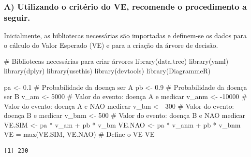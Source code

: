 \documentclass[
  letterpaper,
  DIV=11,
  numbers=noendperiod]{scrartcl}
\newenvironment{Shaded}{\begin{snugshade}}{\end{snugshade}}
\newcommand{\CommentTok}[1]{\textcolor[rgb]{0.37,0.37,0.37}{#1}}
\newcommand{\DecValTok}[1]{\textcolor[rgb]{0.68,0.00,0.00}{#1}}
\newcommand{\FloatTok}[1]{\textcolor[rgb]{0.68,0.00,0.00}{#1}}
\newcommand{\FunctionTok}[1]{\textcolor[rgb]{0.28,0.35,0.67}{#1}}
\newcommand{\NormalTok}[1]{\textcolor[rgb]{0.00,0.23,0.31}{#1}}
\newcommand{\OtherTok}[1]{\textcolor[rgb]{0.00,0.23,0.31}{#1}}
\newcommand{\SpecialCharTok}[1]{\textcolor[rgb]{0.37,0.37,0.37}{#1}}
\begin{document}
\hypertarget{a-utilizando-o-crituxe9rio-do-ve-recomende-o-procedimento-a-seguir.}{%
\subsubsection{A) Utilizando o critério do VE, recomende o procedimento
a
seguir.}\label{a-utilizando-o-crituxe9rio-do-ve-recomende-o-procedimento-a-seguir.}}

Inicialmente, as bibliotecas necessárias são importadas e definem-se os
dados para o cálculo do Valor Esperado (VE) e para a criação da árvore
de decisão.

\begin{Shaded}
\begin{Highlighting}[]
\CommentTok{\# Bibliotecas necessárias para criar árvores }
\FunctionTok{library}\NormalTok{(data.tree)}
\FunctionTok{library}\NormalTok{(yaml)}
\FunctionTok{library}\NormalTok{(dplyr)}
\FunctionTok{library}\NormalTok{(usethis)}
\FunctionTok{library}\NormalTok{(devtools)}
\FunctionTok{library}\NormalTok{(DiagrammeR)}

\NormalTok{pa }\OtherTok{\textless{}{-}} \FloatTok{0.1}       \CommentTok{\# Probabilidade da doença ser A}
\NormalTok{pb }\OtherTok{\textless{}{-}} \FloatTok{0.9}       \CommentTok{\# Probabilidade da doença ser B}
\NormalTok{v\_am }\OtherTok{\textless{}{-}} \DecValTok{5000}    \CommentTok{\# Valor do evento: doença A e medicar}
\NormalTok{v\_anm }\OtherTok{\textless{}{-}} \SpecialCharTok{{-}}\DecValTok{10000} \CommentTok{\# Valor do evento: doença A e NAO medicar}
\NormalTok{v\_bm }\OtherTok{\textless{}{-}} \SpecialCharTok{{-}}\DecValTok{300}    \CommentTok{\# Valor do evento: doença B e medicar}
\NormalTok{v\_bnm }\OtherTok{\textless{}{-}} \DecValTok{500}    \CommentTok{\# Valor do evento: doença B e NAO medicar}
\NormalTok{VE.SIM }\OtherTok{\textless{}{-}}\NormalTok{ pa }\SpecialCharTok{*}\NormalTok{ v\_am }\SpecialCharTok{+}\NormalTok{ pb }\SpecialCharTok{*}\NormalTok{ v\_bm}
\NormalTok{VE.NAO }\OtherTok{\textless{}{-}}\NormalTok{ pa }\SpecialCharTok{*}\NormalTok{ v\_anm }\SpecialCharTok{+}\NormalTok{ pb }\SpecialCharTok{*}\NormalTok{ v\_bnm}
\NormalTok{VE }\OtherTok{=} \FunctionTok{max}\NormalTok{(VE.SIM, VE.NAO) }\CommentTok{\# Define o VE}
\NormalTok{VE}
\end{Highlighting}
\end{Shaded}

\begin{verbatim}
[1] 230
\end{verbatim}
\end{document}
